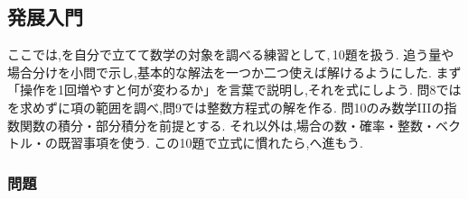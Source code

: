     \subsection{発展入門}\label{節：発展入門}
      ここでは,を自分で立てて数学の対象を調べる練習として,\,10題を扱う.
      追う量や場合分けを小問で示し,基本的な解法を一つか二つ使えば解けるようにした.
      まず「操作を1回増やすと何が変わるか」を言葉で説明し,それを式にしよう.
      問8ではを求めずに項の範囲を調べ,問9では整数方程式の解を作る.
      問10のみ数学IIIの指数関数の積分・部分積分を前提とする.
      それ以外は,場合の数・確率・整数・ベクトル・の既習事項を使う.
      この10題で立式に慣れたら,へ進もう.

      \subsubsection{問題}\label{節：発展入門：問題}
